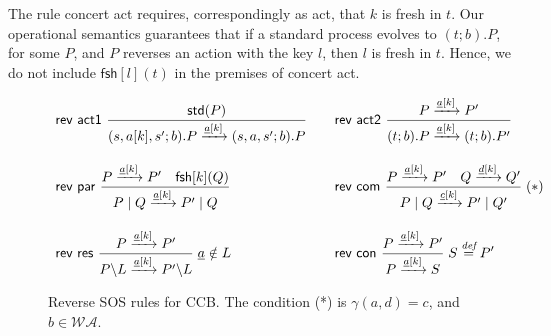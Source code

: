 \documentclass[runningheads]{llncs}
\newcommand{\Rule}[2]{\displaystyle{\frac{#1}{#2}}}
\newcommand{\paral}{\; \vert \;}
\newcommand{\mA}{\mathcal{A}}
\newcommand{\mAK}{\mathcal{AK}}
\newcommand{\rom}[1]{\mbox{\rm{#1}}}
\newcommand{\std}[1]{\mathsf{std}(#1)}
\newcommand{\fresh}[2]{\mathsf{fsh}[#1](#2)}
\newcommand{\bydef}{\stackrel{\emph{def}}{=}}
\newcommand{\rulename}[1]{\textsf{#1}}
\begin{document}
The rule \rulename{concert act} requires, correspondingly as \rulename{act}, that $k$ is fresh in $t$.
Our operational semantics guarantees that if a standard process evolves to $(t;b).P$, for some $P$, and
$P$ reverses an action with the key $l$, then $l$ is fresh in $t$. Hence, we do not include $\fresh{l}{t}$
in the premises of \rulename{concert act}.
%
\begin{figure}
\[
\begin{array}{ll}
\rulename{rev act1}\
\Rule
{\std{P} %
}
{(s,a[k],s';b).P \xrightarrow{\underline{a}[k]}(s,a,s';b).P}
\quad &
%
%
%
\rulename{rev act2}\
\Rule
{P \xrightarrow{\underline{a}[k]} P' %
}
{(t;b).P \xrightarrow{\underline{a}[k]} (t;b).P'}
\\[25pt]
\rulename{rev par}\
\Rule
{P \xrightarrow{\underline{a}[k]} P'\quad \fresh{k}{Q}}
{P \paral Q \xrightarrow{\underline{a}[k]} P' \paral Q}
\quad &
\rulename{rev com}\
\Rule
{P \xrightarrow{\underline{a}[k]} P' \quad Q \xrightarrow{\underline{d}[k]} Q'}
{P \paral Q \xrightarrow{\underline{c}[k]} P' \paral Q'}
\; (*)
%
\\[25pt]
\rulename{rev res}\
\Rule
{P \xrightarrow{\underline{a}[k]} P'}
{P\backslash L \xrightarrow{\underline{a}[k]} P'\backslash L}
\; \underline{a} \notin L
\quad &
\rulename{rev con}\
\Rule
{P \xrightarrow{\underline{a}[k]} P'}
{P \xrightarrow{\underline{a}[k]} S}
\; S \bydef P'
\end{array}
\]
\caption[Reverse SOS rules for CCB.]{Reverse SOS rules for CCB. The condition (*) is $\gamma(a,d)=c$, and $b \in \mathcal{WA}$. %
} 
\label{fig:reversesos}
\end{figure}
\end{document}
